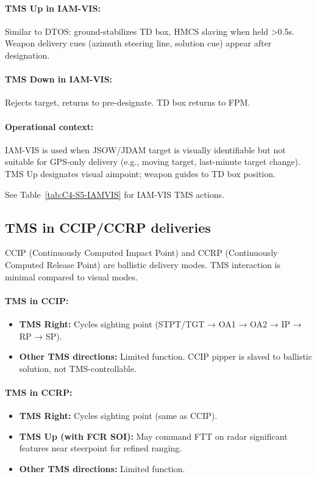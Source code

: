 \documentclass[11pt, a4paper, twoside]{report}
\begin{document}
\paragraph{TMS Up in IAM-VIS:}
Similar to DTOS: ground-stabilizes TD box, HMCS slaving when held >0.5s. Weapon delivery cues (azimuth steering line, solution cue) appear after designation.

\paragraph{TMS Down in IAM-VIS:}
Rejects target, returns to pre-designate. TD box returns to FPM.

\paragraph{Operational context:}
IAM-VIS is used when JSOW/JDAM target is visually identifiable but not suitable for GPS-only delivery (e.g., moving target, last-minute target change). TMS Up designates visual aimpoint; weapon guides to TD box position.

See Table~\ref{tab:C4-S5-IAMVIS} for IAM-VIS TMS actions.

\subsection{TMS in CCIP/CCRP deliveries}
\label{sec:C3-S5-S4}

CCIP (Continuously Computed Impact Point) and CCRP (Continuously Computed Release Point) are ballistic delivery modes. TMS interaction is minimal compared to visual modes.

\paragraph{TMS in CCIP:}
\begin{itemize}
    \item \textbf{TMS Right:} Cycles sighting point (STPT/TGT → OA1 → OA2 → IP → RP → SP).
    \item \textbf{Other TMS directions:} Limited function. CCIP pipper is slaved to ballistic solution, not TMS-controllable.
\end{itemize}

\paragraph{TMS in CCRP:}
\begin{itemize}
    \item \textbf{TMS Right:} Cycles sighting point (same as CCIP).
    \item \textbf{TMS Up (with FCR SOI):} May command FTT on radar significant features near steerpoint for refined ranging.
    \item \textbf{Other TMS directions:} Limited function.
\end{itemize}
\end{document}

